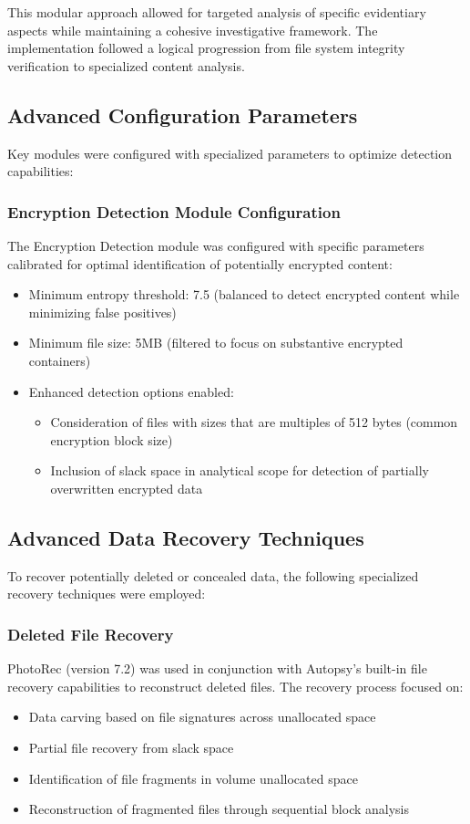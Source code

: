 This modular approach allowed for targeted analysis of specific evidentiary aspects while maintaining a cohesive investigative framework. The implementation followed a logical progression from file system integrity verification to specialized content analysis.

\subsection{Advanced Configuration Parameters}
Key modules were configured with specialized parameters to optimize detection capabilities:

\subsubsection{Encryption Detection Module Configuration}
The Encryption Detection module was configured with specific parameters calibrated for optimal identification of potentially encrypted content:
\begin{itemize}
    \item Minimum entropy threshold: 7.5 (balanced to detect encrypted content while minimizing false positives)
    \item Minimum file size: 5MB (filtered to focus on substantive encrypted containers)
    \item Enhanced detection options enabled:
    \begin{itemize}
        \item Consideration of files with sizes that are multiples of 512 bytes (common encryption block size)
        \item Inclusion of slack space in analytical scope for detection of partially overwritten encrypted data
    \end{itemize}
\end{itemize}


\subsection{Advanced Data Recovery Techniques}
To recover potentially deleted or concealed data, the following specialized recovery techniques were employed:

\subsubsection{Deleted File Recovery}
PhotoRec (version 7.2) was used in conjunction with Autopsy's built-in file recovery capabilities to reconstruct deleted files. The recovery process focused on:
\begin{itemize}
    \item Data carving based on file signatures across unallocated space
    \item Partial file recovery from slack space
    \item Identification of file fragments in volume unallocated space
    \item Reconstruction of fragmented files through sequential block analysis
\end{itemize}

